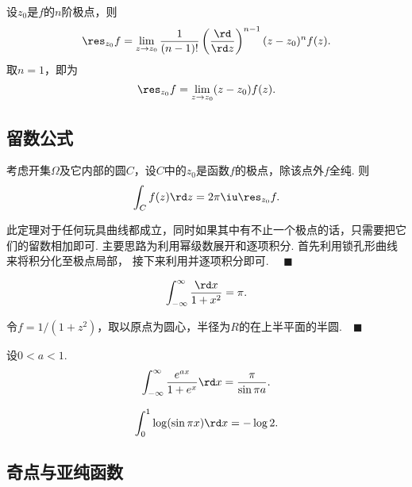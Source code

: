   \begin{thm}[留数的计算]
    设$z_0$是$f$的$n$阶极点，则
    \[
      \res_{z_0}f = \lim_{z\to z_0}\frac{1}{(n-1)!}
      \left(\frac{\rd}{\rd z}\right)^{n-1}(z-z_0)^nf(z).
    \]
    取$n=1$，即为
    \[
     \res_{z_0}f = \lim_{z\to z_0}(z-z_0)f(z). 
    \]
  \end{thm}


\subsection{留数公式}
  \begin{thm}[留数公式]
    考虑开集$\Omega$及它内部的圆$C$，设$C$中的$z_0$是函数$f$的极点，除该点外$f$全纯. 则
    \begin{equation}
      \label{equ: 留数公式}
      \int_C f(z)\rd z = 2\pi\iu\res_{z_0}f.
    \end{equation}
  \end{thm}
  \remark
    此定理对于任何玩具曲线都成立，同时如果其中有不止一个极点的话，只需要把它们的留数相加即可.
  \proof
    主要思路为利用幂级数展开和逐项积分. 首先利用锁孔形曲线来将积分化至极点局部，
    接下来利用并逐项积分即可. $\quad\blacksquare$

  \begin{pos}
    \[
      \int_{-\infty}^\infty \frac{\rd x}{1+x^2} = \pi.
    \]
  \end{pos}
  \proof
    令$f = 1/(1+z^2)$，取以原点为圆心，半径为$R$的在上半平面的半圆.$\quad\blacksquare$

  \begin{pos}
    设$0<a<1$. 
    \[
      \int_{-\infty}^\infty \frac{e^{ax}}{1+e^x}\rd x = \frac{\pi}{\sin\pi a}.
    \]
  \end{pos}

  \begin{pos}
    \[
      \int_0^1\log(\sin\pi x)\rd x = -\log 2.
    \]
  \end{pos}
  
\subsection{奇点与亚纯函数}

